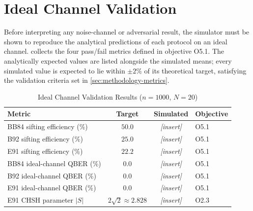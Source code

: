 \documentclass[10pt, a4paper]{report}
\renewcommand{\footnotesize}{\fontsize{8}{9}\selectfont}
\begin{document}
\section{Ideal Channel Validation}
\label{sec:results-ideal}

Before interpreting any noise-channel or adversarial result, the simulator must be shown to reproduce the analytical predictions of each protocol on an ideal channel.  collects the four pass/fail metrics defined in objective O5.1. The analytically expected values are listed alongside the simulated means; every simulated value is expected to lie within $\pm 2\%$ of its theoretical target, satisfying the validation criteria set in \cref{sec:methodology-metrics}.

\begin{table}[ht]
    \centering
    \caption{Ideal Channel Validation Results ($n=1000$, $N=20$)}
    \label{tab:validation}
    \footnotesize
    \begin{tabularx}{\linewidth}{@{}l c c X@{}}
        \toprule
        \textbf{Metric} & \textbf{Target} & \textbf{Simulated} & \textbf{Objective} \\
        \midrule
        BB84 sifting efficiency (\%)     & $50.0$  & \textit{[insert]} & O5.1 \\
        B92 sifting efficiency  (\%)     & $25.0$  & \textit{[insert]} & O5.1 \\
        E91 sifting efficiency  (\%)     & $22.2$  & \textit{[insert]} & O5.1 \\
        BB84 ideal-channel QBER (\%)     & $0.0$   & \textit{[insert]} & O5.1 \\
        B92 ideal-channel QBER  (\%)     & $0.0$   & \textit{[insert]} & O5.1 \\
        E91 ideal-channel QBER  (\%)     & $0.0$   & \textit{[insert]} & O5.1 \\
        E91 CHSH parameter $|S|$         & $2\sqrt{2}\!\approx\!2.828$ & \textit{[insert]} & O2.3 \\
        \bottomrule
    \end{tabularx}
\end{table}
\end{document}
